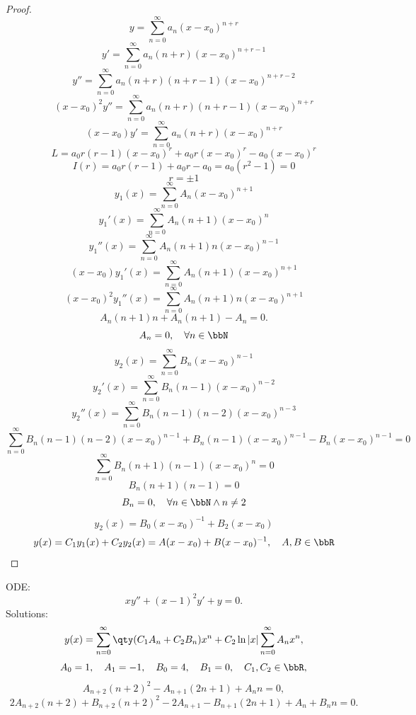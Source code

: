 \documentclass[a4paper,12pt]{report}
\begin{document}
\begin{proof}
\[y=\sum_{n=0}^{\infty}a_n(x-x_0)^{n+r}\]
\[y'=\sum_{n=0}^{\infty}a_n(n+r)(x-x_0)^{n+r-1}\]
\[y''=\sum_{n=0}^{\infty}a_n(n+r)(n+r-1)(x-x_0)^{n+r-2}\]
\[(x-x_0)^2y''=\sum_{n=0}^{\infty}a_n(n+r)(n+r-1)(x-x_0)^{n+r}\]
\[(x-x_0)y'=\sum_{n=0}^{\infty}a_n(n+r)(x-x_0)^{n+r}\]
\[L=a_0r(r-1)(x-x_0)^r+a_0r(x-x_0)^r-a_0(x-x_0)^r\]
\[I(r)=a_0r(r-1)+a_0r-a_0=a_0(r^2-1)=0\]
\[r=\pm 1\]
\[y_1(x)=\sum_{n=0}^{\infty}A_n(x-x_0)^{n+1}\]
\[y_1'(x)=\sum_{n=0}^{\infty}A_n(n+1)(x-x_0)^n\]
\[y_1''(x)=\sum_{n=0}^{\infty}A_n(n+1)n(x-x_0)^{n-1}\]
\[(x-x_0)y_1'(x)=\sum_{n=0}^{\infty}A_n(n+1)(x-x_0)^{n+1}\]
\[(x-x_0)^2y_1''(x)=\sum_{n=0}^{\infty}A_n(n+1)n(x-x_0)^{n+1}\]
\[A_n(n+1)n+A_n(n+1)-A_n=0.\]
\[A_n=0,\quad\forall n\in\bbN\]
\[y_2(x)=\sum_{n=0}^{\infty}B_n(x-x_0)^{n-1}\]
\[y_2'(x)=\sum_{n=0}^{\infty}B_n(n-1)(x-x_0)^{n-2}\]
\[y_2''(x)=\sum_{n=0}^{\infty}B_n(n-1)(n-2)(x-x_0)^{n-3}\]
\[\sum_{n=0}^{\infty}B_n(n-1)(n-2)(x-x_0)^{n-1}+B_n(n-1)(x-x_0)^{n-1}-B_n(x-x_0)^{n-1}=0\]
\[\sum_{n=0}^{\infty}B_n(n+1)(n-1)(x-x_0)^n=0\]
\[B_n(n+1)(n-1)=0\]
\[B_n=0,\quad\forall n\in\bbN\land n\neq 2\]
\[y_2(x)=B_0(x-x_0)^{-1}+B_2(x-x_0)\]
\[y(x)=C_1y_1(x)+C_2y_2(x)=A(x-x_0)+B(x-x_0)^{-1},\quad A,B\in\bbR\]
\end{proof}
ODE:
\[xy''+(x-1)^2y'+y=0.\]
Solutions:
\[y(x)=\sum_{n=0}^{\infty}\qty(C_1A_n+C_2B_n)x^n+C_2\ln|x|\sum_{n=0}^{\infty}A_nx^n,\]
\[A_0=1,\quad A_1=-1,\quad B_0=4,\quad B_1=0,\quad C_1,C_2\in\bbR,\]
\[A_{n+2}(n+2)^2-A_{n+1}(2n+1)+A_nn=0,\]
\[2A_{n+2}(n+2)+B_{n+2}(n+2)^2-2A_{n+1}-B_{n+1}(2n+1)+A_n+B_nn=0.\]
\end{document}
